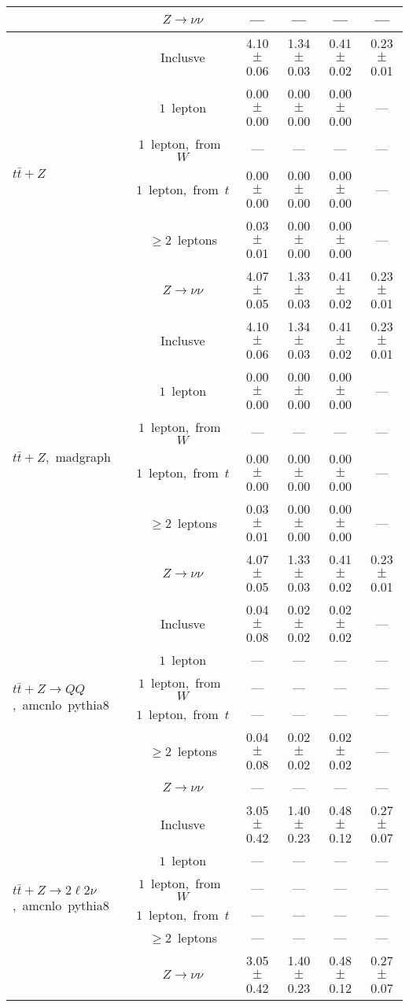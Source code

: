 \documentclass{article}
\begin{document}
\begin{longtable}{|l|c|c|c|c|c|}
 & $Z\rightarrow\nu\nu$  & ---  & ---  & ---  & --- \\* 
\hline 
\multirow{6}{*}{$t\bar{t}+Z$} & Inclusve  & 4.10 $\pm$ 0.06  & 1.34 $\pm$ 0.03  & 0.41 $\pm$ 0.02  & 0.23 $\pm$ 0.01 \\* 
 & $1$~lepton  & 0.00 $\pm$ 0.00  & 0.00 $\pm$ 0.00  & 0.00 $\pm$ 0.00  & --- \\* 
 & $1$~lepton,~from~$W$  & ---  & ---  & ---  & --- \\* 
 & $1$~lepton,~from~$t$  & 0.00 $\pm$ 0.00  & 0.00 $\pm$ 0.00  & 0.00 $\pm$ 0.00  & --- \\* 
 & $\ge2$~leptons  & 0.03 $\pm$ 0.01  & 0.00 $\pm$ 0.00  & 0.00 $\pm$ 0.00  & --- \\* 
 & $Z\rightarrow\nu\nu$  & 4.07 $\pm$ 0.05  & 1.33 $\pm$ 0.03  & 0.41 $\pm$ 0.02  & 0.23 $\pm$ 0.01 \\* 
\hline 
\multirow{6}{*}{$t\bar{t}+Z$,~madgraph} & Inclusve  & 4.10 $\pm$ 0.06  & 1.34 $\pm$ 0.03  & 0.41 $\pm$ 0.02  & 0.23 $\pm$ 0.01 \\* 
 & $1$~lepton  & 0.00 $\pm$ 0.00  & 0.00 $\pm$ 0.00  & 0.00 $\pm$ 0.00  & --- \\* 
 & $1$~lepton,~from~$W$  & ---  & ---  & ---  & --- \\* 
 & $1$~lepton,~from~$t$  & 0.00 $\pm$ 0.00  & 0.00 $\pm$ 0.00  & 0.00 $\pm$ 0.00  & --- \\* 
 & $\ge2$~leptons  & 0.03 $\pm$ 0.01  & 0.00 $\pm$ 0.00  & 0.00 $\pm$ 0.00  & --- \\* 
 & $Z\rightarrow\nu\nu$  & 4.07 $\pm$ 0.05  & 1.33 $\pm$ 0.03  & 0.41 $\pm$ 0.02  & 0.23 $\pm$ 0.01 \\* 
\hline 
\multirow{6}{*}{$t\bar{t}+Z{\rightarrow}QQ$,~amcnlo~pythia8} & Inclusve  & 0.04 $\pm$ 0.08  & 0.02 $\pm$ 0.02  & 0.02 $\pm$ 0.02  & --- \\* 
 & $1$~lepton  & ---  & ---  & ---  & --- \\* 
 & $1$~lepton,~from~$W$  & ---  & ---  & ---  & --- \\* 
 & $1$~lepton,~from~$t$  & ---  & ---  & ---  & --- \\* 
 & $\ge2$~leptons  & 0.04 $\pm$ 0.08  & 0.02 $\pm$ 0.02  & 0.02 $\pm$ 0.02  & --- \\* 
 & $Z\rightarrow\nu\nu$  & ---  & ---  & ---  & --- \\* 
\hline 
\multirow{6}{*}{$t\bar{t}+Z{\rightarrow}2{\ell}2{\nu}$,~amcnlo~pythia8} & Inclusve  & 3.05 $\pm$ 0.42  & 1.40 $\pm$ 0.23  & 0.48 $\pm$ 0.12  & 0.27 $\pm$ 0.07 \\* 
 & $1$~lepton  & ---  & ---  & ---  & --- \\* 
 & $1$~lepton,~from~$W$  & ---  & ---  & ---  & --- \\* 
 & $1$~lepton,~from~$t$  & ---  & ---  & ---  & --- \\* 
 & $\ge2$~leptons  & ---  & ---  & ---  & --- \\* 
 & $Z\rightarrow\nu\nu$  & 3.05 $\pm$ 0.42  & 1.40 $\pm$ 0.23  & 0.48 $\pm$ 0.12  & 0.27 $\pm$ 0.07 \\* 
\hline 
\end{longtable} 
\end{document}

